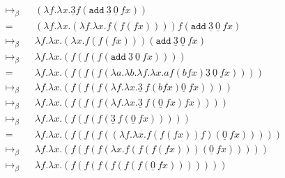 \documentclass[11pt]{article}
\begin{document}
\begin{enumerate}
\begin{enumerate}
\begin{align*}
			            \mapsto_\beta                                  &  & ( \lambda f. \lambda x. \underline{3} f ( \texttt{add}  \:\underline{3}  \:\underline{0} \: f x ))                               & \\
			            =                                              &  & ( \lambda f. \lambda x. ( \lambda f . \lambda x. f(f(f x)))) f( \texttt{add}  \:\underline{3} \: \underline{0}  \:f x)           & \\
			            \mapsto_\beta                                  &  & \lambda f. \lambda x. ( \lambda x. f(f(f x)))( \texttt{add}  \:\underline{3}  \:\underline{0}  \:f x)                            & \\
			            \mapsto_\beta                                  &  & \lambda f. \lambda x. ( f(f(f( \texttt{add}  \:\underline{3} \: \underline{0}  \:f x ))))                                        & \\
			            =                                              &  & \lambda f. \lambda x. (f(f(f( \lambda a. \lambda b. \lambda f. \lambda x. a f (b f x) \underline{3} \: \underline{0} \: f x )))) & \\
			            \mapsto_\beta                                  &  & \lambda f. \lambda x. (f (f(f( \lambda f. \lambda x. \underline{3} \: f ( b f x) \underline{0} \: f x ))))                       & \\
			            \mapsto_\beta                                  &  & \lambda f. \lambda x. (f(f(f( \lambda f. \lambda x. \underline{3} \: f ( \underline{0} \: f x ) f x))))                          & \\
			            \mapsto_\beta                                  &  & \lambda f. \lambda x. (f(f(f( \underline{3} \: f ( \underline{0} \: f x )))))                                                    & \\
			            =                                              &  & \lambda f. \lambda x. (f(f(f(( \lambda f. \lambda x. f(f(f x)) f)( \underline{0} \: f x )))))                                    & \\
			            \mapsto_\beta                                  &  & \lambda f. \lambda x. (f(f(f( \lambda x. f (f(f(fx)))( \underline{0} \: f x )))))                                                & \\
			            \mapsto_\beta                                  &  & \lambda f. \lambda x. (f(f(f(f(f(f( \underline{0} \: f x )))))))                                                                 & \\

\end{align*}
\end{enumerate}
\end{enumerate}
\end{document}
